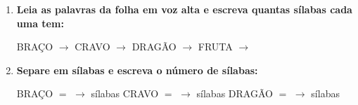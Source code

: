 \begin{exercicio}
\begin{enumerate}[resume]
  \item \textbf{Leia as palavras da folha em voz alta e escreva quantas sílabas cada uma tem:}

  \begin{center}
  BRAÇO $\rightarrow$ \underline{\hspace{1cm}} \quad CRAVO $\rightarrow$ \underline{\hspace{1cm}} \quad DRAGÃO $\rightarrow$ \underline{\hspace{1cm}} \quad FRUTA $\rightarrow$ \underline{\hspace{1cm}}
  \end{center}

  \item \textbf{Separe em sílabas e escreva o número de sílabas:}
  \begin{center}
  BRAÇO $=$ \underline{\hspace{1.2cm}} $\rightarrow$ \underline{\hspace{0.8cm}} sílabas \quad CRAVO $=$ \underline{\hspace{1.2cm}} $\rightarrow$ \underline{\hspace{0.8cm}} sílabas \quad DRAGÃO $=$ \underline{\hspace{1.2cm}} $\rightarrow$ \underline{\hspace{0.8cm}} sílabas
  \end{center}

\end{enumerate}

\end{exercicio}




